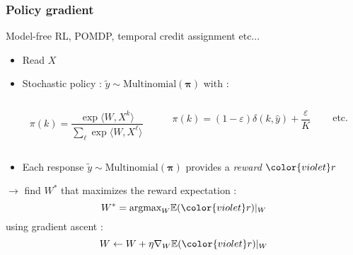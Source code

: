 \documentclass{beamer}
\begin{document}
\begin{frame}\frametitle{Policy gradient \cite{Wil92}}
	\small
	\begin{footnotesize}

	Model-free RL, POMDP, temporal credit assignment etc...

	\begin{itemize}
		\item Read $X$
		\item Stochastic policy : $\tilde{y} \sim \text{Multinomial}(\boldsymbol{\pi})$ with :
		\begin{columns}[b]
			\begin{column}{.35\linewidth}
				\begin{exampleblock}{}
					$$ \pi(k) = \frac{\exp\langle W, X^k\rangle}{\sum_{\ell}\exp\langle W, X^\ell\rangle}$$
				\end{exampleblock}
			\end{column}
			\begin{column}{.4\linewidth}
				\begin{exampleblock}{}
					$$ \pi(k) =  (1-\varepsilon) \delta(k,\hat{y}) + \frac{\varepsilon}{K} $$
				\end{exampleblock}
			\end{column}
			\begin{column}{.1\linewidth}
				\begin{exampleblock}{}
					etc.
				\end{exampleblock}
			\end{column}				
		\end{columns}
		
		
		\item Each response $\tilde{y} \sim \text{Multinomial}(\boldsymbol{\pi})$ provides a \emph{reward} ${\color{violet}r}$
	\end{itemize}
	    
    $\rightarrow$ find $W^*$ that maximizes the reward expectation :
		$$ W^*  = \text{argmax}_W \mathbb{E}({\color{violet}r})|_W$$
		using gradient ascent : 
		$$ W \leftarrow W + \eta \nabla_W \mathbb{E}({\color{violet}r})|_W $$
	\end{footnotesize}
	\normalsize
\end{frame}
\end{document}
